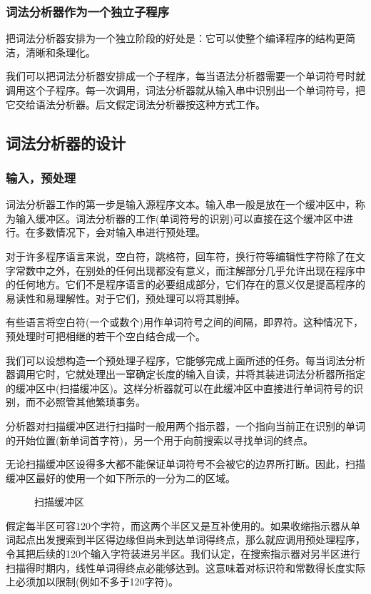 \subsubsection{词法分析器作为一个独立子程序}

把词法分析器安排为一个独立阶段的好处是：它可以使整个编译程序的结构更简洁，清晰和条理化。

我们可以把词法分析器安排成一个子程序，每当语法分析器需要一个单词符号时就调用这个子程序。每一次调用，词法分析器就从输入串中识别出一个单词符号，把它交给语法分析器。后文假定词法分析器按这种方式工作。

\subsection{词法分析器的设计}
\subsubsection{输入，预处理}

词法分析器工作的第一步是输入源程序文本。输入串一般是放在一个缓冲区中，称为输入缓冲区。词法分析器的工作(单词符号的识别)可以直接在这个缓冲区中进行。在多数情况下，会对输入串进行预处理。

\textcolor{tip}{对于许多程序语言来说，空白符，跳格符，回车符，换行符等编辑性字符除了在文字常数中之外，在别处的任何出现都没有意义}，而注解部分几乎允许出现在程序中的任何地方。它们不是程序语言的必要组成部分，它们存在的意义仅是提高程序的易读性和易理解性。对于它们，\textcolor{tip}{预处理可以将其剔掉}。

有些语言将空白符(一个或数个)用作单词符号之间的间隔，即界符。这种情况下，预处理时可\textcolor{tip}{把相继的若干个空白结合成一个}。

我们可以设想构造一个预处理子程序，它能够完成上面所述的任务。每当词法分析器调用它时，它就处理出一窜确定长度的输入自读，并将其装进词法分析器所指定的缓冲区中(扫描缓冲区)。这样分析器就可以在此缓冲区中直接进行单词符号的识别，而不必照管其他繁琐事务。

分析器对扫描缓冲区进行扫描时一般用两个指示器，一个指向当前正在识别的单词的开始位置(新单词首字符)，另一个用于向前搜索以寻找单词的终点。

无论扫描缓冲区设得多大都不能保证单词符号不会被它的边界所打断。因此，扫描缓冲区最好的使用一个如下所示的一分为二的区域。
\begin{figure}[H]
    \centering
    \caption{扫描缓冲区}
    \label{扫描缓冲区}
\end{figure}
假定每半区可容120个字符，而这两个半区又是互补使用的。如果收缩指示器从单词起点出发搜索到半区得边缘但尚未到达单词得终点，那么就应调用预处理程序，令其把后续的120个输入字符装进另半区。我们认定，在搜索指示器对另半区进行扫描得时期内，线性单词得终点必能够达到。这意味着对标识符和常数得长度实际上必须加以限制(例如不多于120字符)。

